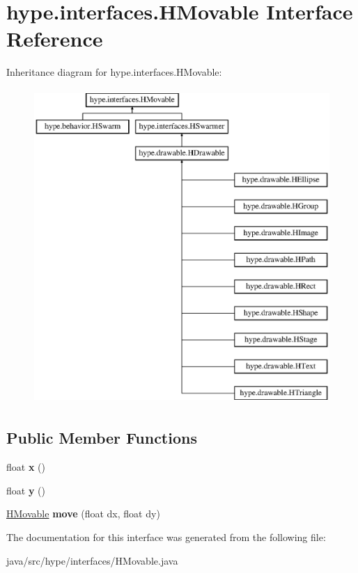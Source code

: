 \hypertarget{interfacehype_1_1interfaces_1_1_h_movable}{\section{hype.\-interfaces.\-H\-Movable Interface Reference}
\label{interfacehype_1_1interfaces_1_1_h_movable}
}
Inheritance diagram for hype.\-interfaces.\-H\-Movable\-:\begin{figure}[H]
\begin{center}
\leavevmode
\includegraphics[height=12.000000cm]{interfacehype_1_1interfaces_1_1_h_movable}
\end{center}
\end{figure}
\subsection*{Public Member Functions}
\begin{DoxyCompactItemize}
\item 
\hypertarget{interfacehype_1_1interfaces_1_1_h_movable_a9fa6cf7db5aec0c414ace25bca6b42d4}{float {\bfseries x} ()}\label{interfacehype_1_1interfaces_1_1_h_movable_a9fa6cf7db5aec0c414ace25bca6b42d4}

\item 
\hypertarget{interfacehype_1_1interfaces_1_1_h_movable_ac0cb093b7075064c587cd7e7d385756f}{float {\bfseries y} ()}\label{interfacehype_1_1interfaces_1_1_h_movable_ac0cb093b7075064c587cd7e7d385756f}

\item 
\hypertarget{interfacehype_1_1interfaces_1_1_h_movable_a38d9de6c9260e1eb1384e0869a60cd19}{\hyperlink{interfacehype_1_1interfaces_1_1_h_movable}{H\-Movable} {\bfseries move} (float dx, float dy)}\label{interfacehype_1_1interfaces_1_1_h_movable_a38d9de6c9260e1eb1384e0869a60cd19}

\end{DoxyCompactItemize}


The documentation for this interface was generated from the following file\-:\begin{DoxyCompactItemize}
\item 
java/src/hype/interfaces/H\-Movable.\-java\end{DoxyCompactItemize}
